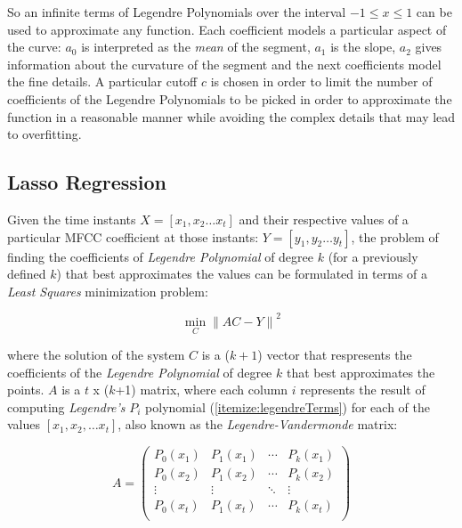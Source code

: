 So an infinite terms of Legendre Polynomials over the interval \mbox{$-1 \leq x \leq 1$} can be used
to approximate any function. Each coefficient models a particular aspect of the curve: $a_{0}$
is interpreted as the \textit{mean} of the segment, $a_{1}$ is the slope, $a_{2}$ gives
information about the curvature of the segment and the next coefficients model the fine details.
A particular cutoff $c$ is chosen in order to limit the number of coefficients of the
Legendre Polynomials to be picked in order to approximate the function in a reasonable manner
while avoiding the complex details that may lead to overfitting.

\subsection{Lasso Regression}

Given the time instants $X=[x_{1}, x_{2} \dotsc x_{t}]$ and their respective values of a particular
MFCC coefficient at those instants: $Y=[y_{1}, y_{2} \dotsc y_{t}]$,
the problem of finding the coefficients of \textit{Legendre Polynomial} of degree $k$
(for a previously defined $k$) that best approximates
the values can be formulated in terms of a \textit{Least Squares} minimization problem:

\begin{equation}
  \min_{C} {\| AC - Y \|}^{2}
\end{equation}

where the solution of the system $C$ is a ($k+1$) vector that respresents the coefficients
of the \textit{Legendre Polynomial} of degree $k$ that best approximates the points.
$A$ is a $t$ x ($k$+1) matrix, where each column $i$ represents the result of computing
\textit{Legendre's} $P_{i}$ polynomial (\ref{itemize:legendreTerms}) for each of the values
$[x_{1}, x_{2}, \dotsc x_{t}]$, also known as the \textit{Legendre-Vandermonde} matrix:

\begin{equation}
  A =
    \begin{pmatrix}
      P_{0}(x_{1}) & P_{1}(x_{1}) & \cdots & P_{k}(x_{1}) \\
      P_{0}(x_{2}) & P_{1}(x_{2}) & \cdots & P_{k}(x_{2}) \\
      \vdots & \vdots & \ddots & \vdots \\
      P_{0}(x_{t}) & P_{1}(x_{t}) & \cdots & P_{k}(x_{t}) \\
    \end{pmatrix}
\end{equation}

